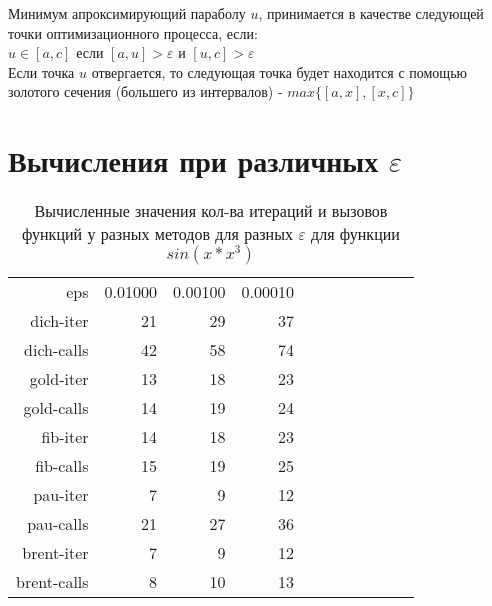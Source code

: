 \documentclass[fleqn]{article}
\begin{document}
Минимум апроксимирующий параболу $u$, принимается в качестве следующей точки оптимизационного процесса, если:\\

$u\in[a,c]$ если $[a,u]>\varepsilon$ и $[u,c]>\varepsilon$\\

Если точка $u$ отвергается, то следующая точка будет находится с помощью золотого сечения (большего из интервалов) - $max\{[a,x],[x,c]\}$\\

\section{Вычисления при различных $\varepsilon$}
\begin{table}[htp]
    \centering
    \caption{Вычисленные значения кол-ва итераций и вызовов функций у разных методов для разных $\varepsilon$ для функции $sin(x*x^3)$}
    \begin{tabular}{rrrrrrrrrrr}
        eps & 0.01000 & 0.00100 & 0.00010 \\
        dich-iter   & 21      & 29      & 37 \\
        dich-calls  & 42      & 58      & 74 \\
        gold-iter   & 13      & 18      & 23 \\
        gold-calls  & 14      & 19      & 24 \\
        fib-iter    & 14      & 18      & 23 \\
        fib-calls   & 15      & 19      & 25 \\
        pau-iter    & 7       & 9       & 12 \\
        pau-calls   & 21      & 27      & 36 \\
        brent-iter  & 7       & 9       & 12 \\
        brent-calls & 8       & 10      & 13 \\
    \end{tabular}
\end{table}
\end{document}
